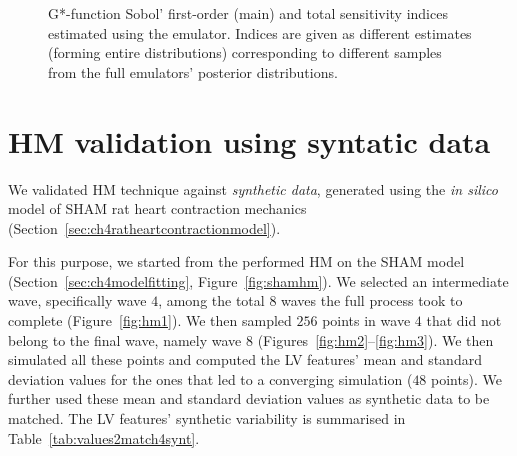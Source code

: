 \begin{figure}[ht!]
    \myfloatalign
    \quad
    \caption{G*-function Sobol' first-order (main) and total sensitivity indices estimated using the emulator. Indices are given as different estimates (forming entire distributions) corresponding to different samples from the full emulators' posterior distributions.}
    \label{fig:gstar_emulator_estimates}
\end{figure}


%
%
%
\cleardoublepage
\section{HM validation using syntatic data}\label{chA:HM_validation_using_syntatic_data}
We validated HM technique against \textit{synthetic data}, generated using the \textit{in silico} model of SHAM rat heart contraction mechanics (Section~\ref{sec:ch4ratheartcontractionmodel}).

\vspace{0.2cm}
For this purpose, we started from the performed HM on the SHAM model (Section~\ref{sec:ch4modelfitting}, Figure~\ref{fig:shamhm}). We selected an intermediate wave, specifically wave $4$, among the total $8$ waves the full process took to complete (Figure~\ref{fig:hm1}). We then sampled $256$ points in wave $4$ that did not belong to the final wave, namely wave $8$ (Figures~\ref{fig:hm2}--\ref{fig:hm3}). We then simulated all these points and computed the LV features' mean and standard deviation values for the ones that led to a converging simulation ($48$ points). We further used these mean and standard deviation values as synthetic data to be matched. The LV features' synthetic variability is summarised in Table~\ref{tab:values2match4synt}.

